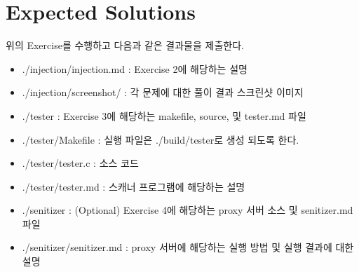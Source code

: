 \documentclass[a4paper, 11pt]{article}
\theoremstyle{definition}
\begin{document}
\section{Expected Solutions}

위의 Exercise를 수행하고 다음과 같은 결과물을 제출한다. 

\begin{itemize}
  \item ./injection/injection.md : Exercise 2에 해당하는 설명 
  \item ./injection/screenshot/ : 각 문제에 대한 풀이 결과 스크린샷 이미지 

  \item ./tester : Exercise 3에 해당하는 makefile, source, 및 tester.md 파일 
  \item ./tester/Makefile : 실행 파일은 ./build/tester로 생성 되도록 한다. 
  \item ./tester/tester.c :  소스 코드 
  \item ./tester/tester.md  : 스캐너 프로그램에 해당하는 설명 

  \item ./senitizer : (Optional) Exercise 4에 해당하는 proxy 서버 소스 및 senitizer.md 파일 
  \item ./senitizer/senitizer.md : proxy 서버에 해당하는 실행 방법 및 실행 결과에 대한 설명 
\end{itemize}



\end{document}
